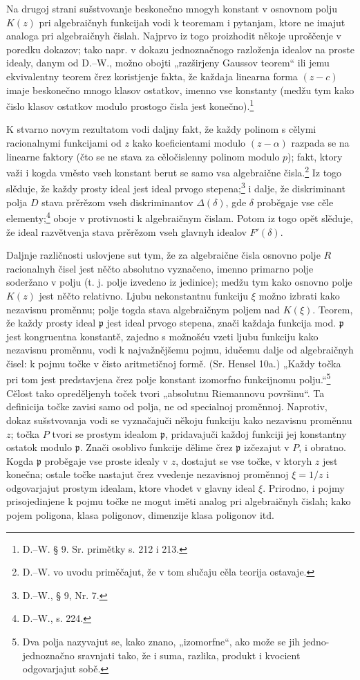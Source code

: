 \documentclass[11pt]{article}
\providecommand{\frp}{\mathfrak p}
\begin{document}
Na drugoj strani sušstvovanje beskonečno mnogyh konstant v osnovnom polju \(K(z)\) pri algebraičnyh funkcijah vodi k teoremam i pytanjam, ktore ne imajut analoga pri algebraičnyh čislah. Najprvo iz togo proizhodit někoje uproščenje v poredku dokazov; tako napr. v dokazu jednoznačnogo razloženja idealov na proste idealy, danym od D.--W., možno obojti „razširjeny Gaussov teorem“ ili jemu ekvivalentny teorem črez koristjenje fakta, že každaja linearna forma \((z-c)\) imaje beskonečno mnogo klasov ostatkov, imenno vse konstanty (medžu tym kako čislo klasov ostatkov modulo prostogo čisla jest konečno).\footnote{D.--W. § 9. Sr. primětky s. 212 i 213.}

K stvarno novym rezultatom vodi daljny fakt, že každy polinom s cělymi racionalnymi funkcijami od \(z\) kako koeficientami modulo \((z-\alpha)\) razpada se na linearne faktory (čto se ne stava za cěločislenny polinom modulo \(p\)); fakt, ktory važi i kogda vměsto vseh konstant berut se samo vsa algebraične čisla.\footnote{D.--W. vo uvodu priměčajut, že v tom slučaju cěla teorija ostavaje.} Iz togo slěduje, že každy prosty ideal jest ideal prvogo stepena;\footnote{D.--W., § 9, Nr. 7.} i dalje, že diskriminant polja \(D\) stava prěrězom vseh diskriminantov \(\Delta(\delta)\), gde \(\delta\) proběgaje vse cěle elementy;\footnote{D.--W., s. 224.} oboje v protivnosti k algebraičnym čislam. Potom iz togo opět slěduje, že ideal razvětvenja stava prěrězom vseh glavnyh idealov \(F'(\delta)\).

Daljnje različnosti uslovjene sut tym, že za algebraične čisla osnovno polje \(R\) racionalnyh čisel jest něčto absolutno vyznačeno, imenno primarno polje soderžano v polju (t. j. polje izvedeno iz jedinice); medžu tym kako osnovno polje \(K(z)\) jest něčto relativno. Ljubu nekonstantnu funkciju \(\xi\) možno izbrati kako nezavisnu proměnnu; polje togda stava algebraičnym poljem nad \(K(\xi)\). Teorem, že každy prosty ideal \(\frp\) jest ideal prvogo stepena, znači každaja funkcija mod. \(\frp\) jest kongruentna konstantě, zajedno s možnošću vzeti ljubu funkciju kako nezavisnu proměnnu, vodi k najvažnějšemu pojmu, idučemu dalje od algebraičnyh čisel: k pojmu točke v čisto aritmetičnoj formě. (Sr. Hensel 10a.) „Každy točka pri tom jest predstavjena črez polje konstant izomorfno funkcijnomu polju.“\footnote{Dva polja nazyvajut se, kako znano, „izomorfne“, ako može se jih jedno-jednoznačno sravnjati tako, že i suma, razlika, produkt i kvocient odgovarjajut sobě.} Cělost tako opreděljenyh toček tvori „absolutnu Riemannovu površinu“. Ta definicija točke zavisi samo od polja, ne od specialnoj proměnnoj. Naprotiv, dokaz sušstvovanja vodi se vyznačajuči někoju funkciju kako nezavisnu proměnnu \(z\); točka \(P\) tvori se prostym idealom \(\frp\), pridavajuči každoj funkciji jej konstantny ostatok modulo \(\frp\). Znači osoblivo funkcije dělime črez \(\frp\) izčezajut v \(P\), i obratno. Kogda \(\frp\) proběgaje vse proste idealy v \(z\), dostajut se vse točke, v ktoryh \(z\) jest konečna; ostale točke nastajut črez vvedenje nezavisnoj proměnnoj \(\xi=1/z\) i odgovarjajut prostym idealam, ktore vhodet v glavny ideal \(\xi\). Prirodno, i pojmy prisojedinjene k pojmu točke ne mogut iměti analog pri algebraičnyh čislah; kako pojem poligona, klasa poligonov, dimenzije klasa poligonov itd.
\end{document}
